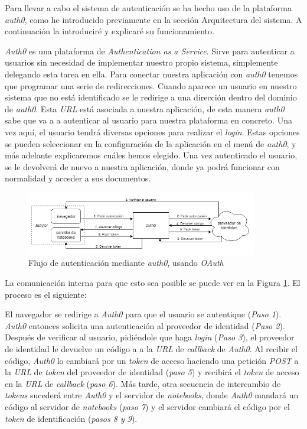 \documentclass[11pt,spanish,listoffigures]{tfgetsinf}
\begin{document}
Para llevar a cabo el sistema de autenticación se ha hecho uso de la plataforma \textit{auth0}, como he introducido previamente en la sección Arquitectura del sistema. A continuación la introduciré y explicaré su funcionamiento.

\textit{Auth0} es una plataforma de \textit{Authentication as a Service}. Sirve para autenticar a usuarios sin necesidad de implementar nuestro propio sistema, simplemente delegando esta tarea en ella. Para conectar nuestra aplicación con \textit{auth0} tenemos que programar una serie de redirecciones. Cuando aparece un usuario en nuestro sistema que no está identificado se le redirige a una dirección dentro del dominio de \textit{auth0}. Esta \textit{URL} está asociada a nuestra aplicación, de esta manera \textit{auth0} sabe que va a a autenticar al usuario para nuestra plataforma en concreto. Una vez aquí, el usuario tendrá diversas opciones para realizar el \textit{login}. Estas opciones se pueden seleccionar en la configuración de la aplicación en el menú de \textit{auth0}, y más adelante explicaremos cuáles hemos elegido. Una vez autenticado el usuario, se le devolverá de nuevo a nuestra aplicación, donde ya podrá funcionar con normalidad y acceder a sus documentos.

\begin{figure}[h]
	\centering
  	\includegraphics[width=0.9\textwidth]{auth0-flow.png}
  	\caption{Flujo de autenticación mediante \textit{auth0}, usando \textit{OAuth}}
  	\label{fig:auth0-scheme}
\end{figure}

La comunicación interna para que esto sea posible se puede ver en la Figura \ref{fig:auth0-scheme}. El proceso es el siguiente: 

El navegador se redirige a \textit{Auth0} para que el usuario se autentique (\textit{Paso 1}). \textit{Auth0} entonces solicita una autenticación al proveedor de identidad (\textit{Paso 2}). Después de verificar al usuario, pidiéndole que haga \textit{login} (\textit{Paso 3}), el proveedor de identidad le devuelve un código a a la \textit{URL} de \textit{\gls{callback}} de \textit{Auth0}. Al recibir el código, \textit{Auth0} lo cambiará por un \textit{token} de acceso haciendo una petición \textit{POST} a la \textit{URL} de \textit{token} del proveedor de identidad (\textit{paso 5}) y recibirá el \textit{token} de acceso en la \textit{URL} de \textit{callback} (\textit{paso 6}). Más tarde, otra secuencia de intercambio de \textit{tokens} sucederá entre \textit{Auth0} y el servidor de \textit{notebooks}, donde \textit{Auth0} mandará un código al servidor de \textit{notebooks} (\textit{paso 7}) y el servidor cambiará el código por el \textit{token} de identificación (\textit{pasos 8 y 9}).
\end{document}

